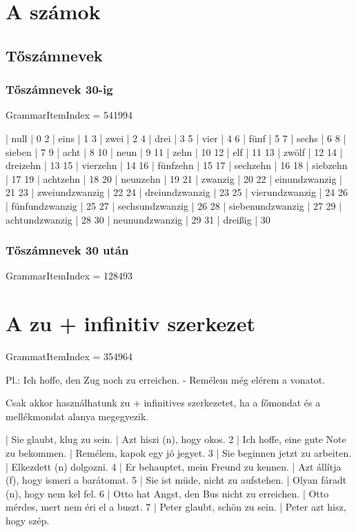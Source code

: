 \documentclass{article}
\newenvironment{desc}{\verbatim}{\endverbatim}
\newenvironment{exmp}{\verbatim}{\endverbatim}
\begin{document}
\section{A számok}

\subsection{Tőszámnevek}

\subsubsection{Tőszámnevek 30-ig}

GrammarItemIndex = 541994

\begin{exmp}
1 | null | 0
2 | eins | 1
3 | zwei | 2
4 | drei | 3
5 | vier | 4
6 | fünf | 5
7 | sechs | 6
8 | sieben | 7
9 | acht | 8
10 | neun | 9
11 | zehn | 10
12 | elf | 11
13 | zwölf | 12
14 | dreizehn | 13
15 | vierzehn | 14
16 | fünfzehn | 15
17 | sechzehn | 16
18 | siebzehn | 17
19 | achtzehn | 18
20 | neunzehn | 19
21 | zwanzig | 20
22 | einundzwanzig | 21
23 | zweiundzwanzig | 22
24 | dreiundzwanzig | 23
25 | vierundzwanzig | 24
26 | fünfundzwanzig | 25
27 | sechsundzwanzig | 26
28 | siebenundzwanzig | 27
29 | achtundzwanzig | 28
30 | neunundzwanzig | 29
31 | dreißig | 30
\end{exmp}

\subsubsection{Tőszámnevek 30 után}

GrammarItemIndex = 128493

\section{A zu + infinitiv szerkezet}

GrammatItemIndex = 354964

\begin{desc}
Pl.: Ich hoffe, den Zug noch zu erreichen. - Remélem még elérem a vonatot.

Csak akkor használhatunk zu + infinitives szerkezetet, ha a főmondat és a mellékmondat alanya megegyezik.
\end{desc}

\begin{exmp}
1 | Sie glaubt, klug zu sein. | Azt hiszi (n), hogy okos.
2 | Ich hoffe, eine gute Note zu bekommen. | Remélem, kapok egy jó jegyet.
3 | Sie beginnen jetzt zu arbeiten. | Elkezdett (n) dolgozni.
4 | Er behauptet, mein Freund zu kennen. | Azt állítja (f), hogy ismeri a barátomat.
5 | Sie ist müde, nicht zu aufstehen. | Olyan fáradt (n), hogy nem kel fel.
6 | Otto hat Angst, den Bus nicht zu erreichen. | Otto mérdes, mert nem éri el a buszt.
7 | Peter glaubt, schön zu sein. | Peter azt hisz, hogy szép.
\end{exmp}
\end{document}
